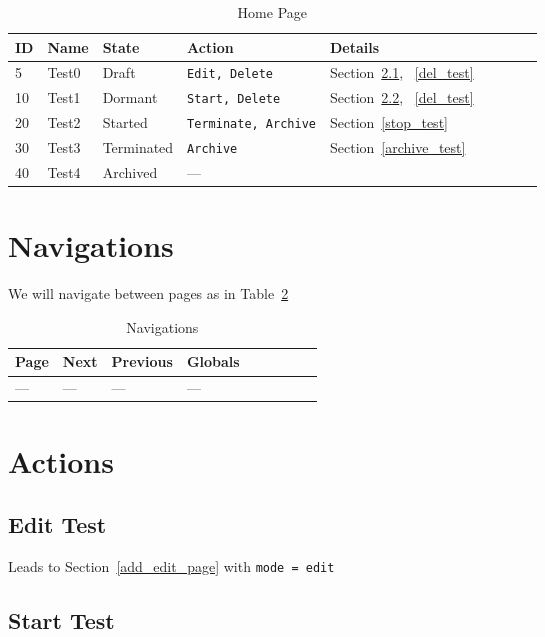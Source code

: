 \documentclass[letterpaper]{article}
\begin{document}
\begin{table}[hb]
\centering
\begin{tabular}{|l||l|l|l|l|l|l|l|l|}  \hline \hline
  {\bf ID} & {\bf Name} & {\bf State} & {\bf Action} & {\bf Details} \\ \hline \hline
  5 & Test0 & Draft & {\tt Edit, Delete} & Section~\ref{edit_test},
  ~\ref{del_test} \\ \hline 
  10 & Test1 & Dormant & {\tt Start, Delete} &  Section~\ref{start_test},
  ~\ref{del_test} \\ \hline 
  20 & Test2 & Started & {\tt Terminate, Archive} & Section~\ref{stop_test} \\ \hline 
  30 & Test3 & Terminated & {\tt Archive} & Section~\ref{archive_test} \\ \hline 
  40 & Test4 & Archived & --- &  \\ \hline
\hline
\end{tabular}
\caption{Home Page}
\label{tbl_home}
\end{table}


\section{Navigations}
We will navigate between pages as in Table~\ref{tbl_navigations}
\begin{table}[hb]
\centering
\begin{tabular}{|l||l|l|l|l|l|l|l|l|}  \hline \hline
  {\bf Page} & {\bf Next} & {\bf Previous} & {\bf Globals} \\ \hline
  --- & --- & --- & --- \\ \hline
\hline
\end{tabular}
\caption{Navigations}
\label{tbl_navigations}
\end{table}

\section{Actions}
\subsection{Edit Test}
\label{edit_test}
Leads to Section~\ref{add_edit_page} with {\tt mode = edit}
\subsection{Start Test}
\label{start_test}
\end{document}
